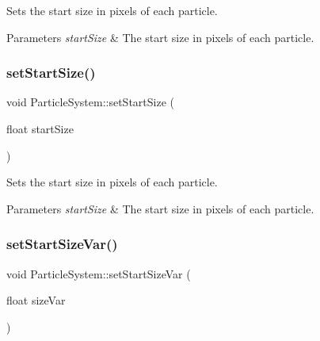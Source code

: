 Sets the start size in pixels of each particle.


\begin{DoxyParams}{Parameters}
{\em start\+Size} & The start size in pixels of each particle. \\
\hline
\end{DoxyParams}
\mbox{\label{classParticleSystem_a4a45431269256ddc1240da2771bdbd51}} 
\subsubsection{\texorpdfstring{set\+Start\+Size()}{setStartSize()}\hspace{0.1cm}{\footnotesize\ttfamily [2/2]}}
{\footnotesize\ttfamily void Particle\+System\+::set\+Start\+Size (\begin{DoxyParamCaption}\item[{float}]{start\+Size }\end{DoxyParamCaption})\hspace{0.3cm}{\ttfamily [inline]}}

Sets the start size in pixels of each particle.


\begin{DoxyParams}{Parameters}
{\em start\+Size} & The start size in pixels of each particle. \\
\hline
\end{DoxyParams}
\mbox{\label{classParticleSystem_a9f7ee2a4e5ae1f3b9b47a854a6e2fc2a}} 
\subsubsection{\texorpdfstring{set\+Start\+Size\+Var()}{setStartSizeVar()}\hspace{0.1cm}{\footnotesize\ttfamily [1/2]}}
{\footnotesize\ttfamily void Particle\+System\+::set\+Start\+Size\+Var (\begin{DoxyParamCaption}\item[{float}]{size\+Var }\end{DoxyParamCaption})\hspace{0.3cm}{\ttfamily [inline]}}

